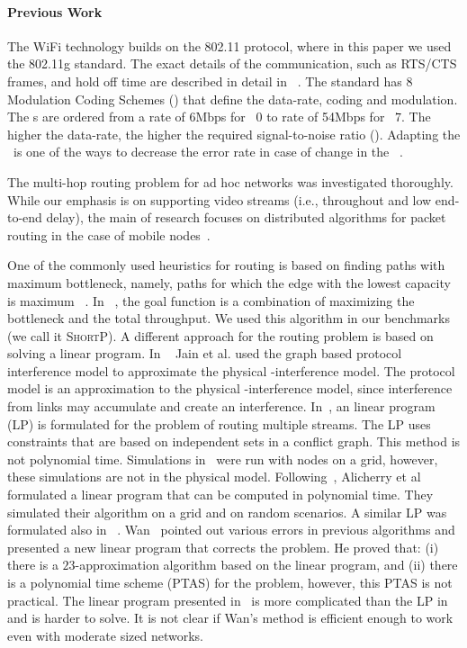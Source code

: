 \documentclass[12pt]{article}
\newenvironment{proof sketch}[1]{\noindent {\emph{Proof sketch of #1:}}}{\hfill \qed}
\newcommand{\SINR}{\text{\sc{sinr}}}
\newcommand{\SNR}{\text{\sc{snr}}}
\newcommand{\MCS}{\text{\sc{mcs}}}
\newcommand{\algB}{\textsc{ShortP}}
\newcommand{\algS}{\algB}
\begin{document}
\paragraph{Previous Work}

The WiFi technology builds on the 802.11 protocol, where in this paper
we used the 802.11g standard. The exact details of the communication,
such as RTS/CTS frames, and hold off time are described in detail in
~\cite{gast2005802}. The standard has 8 Modulation Coding Schemes
(\MCS) that define the data-rate, coding and modulation. The \MCS s
are ordered from a rate of 6Mbps for \MCS\ $0$ to rate of 54Mbps for
\MCS\ $7$.  The higher the data-rate, the higher the required
signal-to-noise ratio (\SNR). Adapting the \MCS\ is one of the ways to
decrease the error rate in case of change in the \SNR
~\cite{kamerman1997wavelan,holland2001rate}.

The multi-hop routing problem for ad hoc networks was investigated
thoroughly.  While our emphasis is on supporting video streams (i.e.,
throughout and low end-to-end delay), the main of research focuses on
distributed algorithms for packet routing in the case of mobile
nodes~\cite{johnson1996dynamic,broch1998performance,perkins2002ad}.

One of the commonly used heuristics for routing is based on finding
paths with maximum bottleneck, namely, paths for which the edge with
the lowest capacity is maximum ~\cite{draves2004routing}. In
~\cite{draves2004routing}, the goal function is a combination of
maximizing the bottleneck and the total throughput. We used this
algorithm in our benchmarks (we call it \algS). A different approach
for the routing problem is based on solving a linear program. In
~\cite{jain2005impact} Jain et al. used the graph based protocol
interference model to approximate the physical \SINR-interference
model. The protocol model is an approximation to the physical
\SINR-interference model, since interference from links may accumulate
and create an interference.  In~\cite{jain2005impact}, an linear
program (LP) is formulated for the problem of routing multiple
streams. The LP uses constraints that are based on independent sets in
a conflict graph. This method is not polynomial time.  Simulations
in~\cite{jain2005impact} were run with nodes on a grid, however, these
simulations are not in the physical model.
Following~\cite{jain2005impact}, Alicherry et al
~\cite{alicherry2005joint11} formulated a linear program that can be
computed in polynomial time.  They simulated their algorithm on a grid
and on random scenarios. A similar LP was formulated also in
~\cite{buragohain2007improved}. Wan~\cite{wan2009multiflows} pointed
out various errors in previous algorithms and presented a new linear
program that corrects the problem. He proved that: (i) there is a
$23$-approximation algorithm based on the linear program, and (ii)
there is a polynomial time scheme (PTAS) for the problem, however,
this PTAS is not practical. The linear program presented
in~\cite{wan2009multiflows} is more complicated than the LP
in~\cite{alicherry2005joint11,buragohain2007improved} and is harder to
solve. It is not clear if Wan's method is efficient enough to work
even with moderate sized networks.
\end{document}
